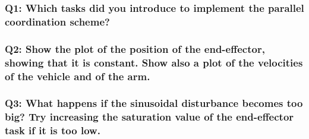 \documentclass{article}
\begin{document}
\subsubsection{Q1: Which tasks did you introduce to implement the parallel coordination scheme?}

\subsubsection{Q2: Show the plot of the position of the end-effector, showing that it is constant. Show also a plot of the velocities of the vehicle and of the arm.}

\subsubsection{Q3: What happens if the sinusoidal disturbance becomes too big? Try increasing the saturation value of the end-effector task if it is too low.}





		
\end{document}
